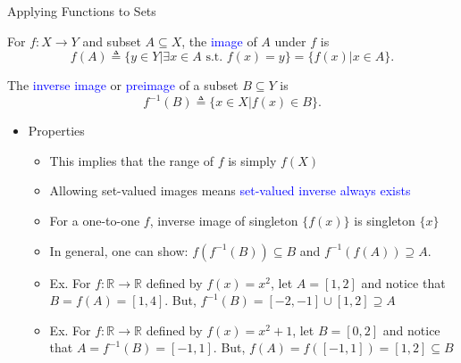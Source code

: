 \documentclass[10pt,english]{beamer}
\begin{document}
\begin{frame}{Applying Functions to Sets}

\vspace{4mm}
\begin{definition}
For $f \colon X\rightarrow Y$ and subset $A\subseteq X$, the \textcolor{blue}{image} of $A$ under $f$ is \vspace{-2mm}
\[ f(A) \triangleq \{ y\in Y | \exists x\in A \textrm{ s.t. } f(x)=y\} = \{f(x) | x\in A\}. \]
\end{definition}
\vspace{0mm}
\begin{definition}
The \textcolor{blue}{inverse image} or \textcolor{blue}{preimage} of a subset $B\subseteq Y$ is \vspace{-2mm}
\[ f^{-1}(B) \triangleq \{ x\in X | f(x)\in B\}. \]
\end{definition}
\vspace{-4.5mm}

\begin{itemize}
\setlength\itemsep{3mm}
\item<2-> Properties \vspace{1mm}
\begin{itemize}
  \setlength\itemsep{1.5mm}
  \item This implies that the range of $f$ is simply $f(X)$
  \item Allowing set-valued images means \textcolor{blue}{set-valued inverse always exists}
  \item For a one-to-one $f$, inverse image of singleton $\{ f(x) \}$ is singleton $\{ x \}$
  \item In general, one can show: $f(f^{-1}(B)) \subseteq B$ and $f^{-1}(f(A)) \supseteq A$.
  \item<3-> Ex. For $f \colon \mathbb{R} \rightarrow \mathbb{R}$ defined by $f(x)=x^2$, let $A=[1,2]$ and notice that $B = f(A) = [1,4]$.  But, $f^{-1}(B) = [-2,-1] \cup [1,2] \supseteq A$
  \item<4-> Ex. For $f \colon \mathbb{R} \rightarrow \mathbb{R}$ defined by $f(x)=x^2+1$, let $B=[0,2]$ and notice that $A = f^{-1}(B) = [-1,1]$.  But, $f(A) = f([-1,1]) = [1,2] \subseteq B$
\end{itemize}
\end{itemize}

\end{frame}  
  
\end{document}

